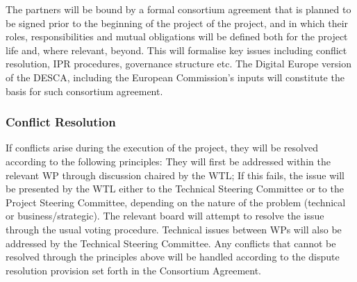 \documentclass[a4paper,11pt]{article}
\begin{document}


The partners will be bound by a formal consortium agreement that is
planned to be signed prior to the beginning of the project of the project,
and in which their roles, responsibilities and mutual obligations will be
defined both for the project life and, where relevant, beyond.  This will
formalise key issues including conflict resolution, IPR procedures, governance structure
etc.  %
The Digital Europe version of the DESCA, including the European Commission's
inputs will constitute the basis for such consortium agreement.

\subsubsection*{Conflict Resolution}
\label{conflict-resolution}
If conflicts arise during the execution of the project, they will be resolved according to the following principles:
% 
They will first be addressed within the relevant WP through discussion chaired by the WTL;
If this fails, the issue will be presented by the WTL either to the Technical Steering Committee
or to the Project Steering Committee, depending on the nature of the problem (technical or business/strategic).
The relevant board will attempt to resolve the issue through the usual voting procedure.
%
Technical issues between WPs will also be addressed by the Technical Steering Committee.
Any conflicts that cannot be resolved through the principles above will
be handled according to the dispute resolution provision set forth in the
Consortium Agreement.
\end{document}
